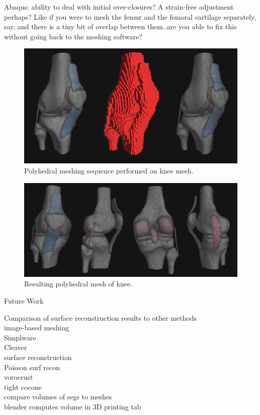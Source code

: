 Abaqus: ability to deal with initial over-closures? A strain-free adjustment perhaps? Like if you were to mesh the femur and the femoral cartilage separately, say, and there is a tiny bit of overlap between them..are you able to fix this without going back to the meshing software?  

\begin{figure}[tbh]
\centering
\includegraphics{media/sequence.png}
\caption[sequence]{Polyhedral meshing sequence performed on knee mesh.}
\label{fig.sequence}
\end{figure}

\begin{figure}[tbh]
\centering
\includegraphics[scale=0.82]{media/fullmesh.png}
\caption[polyhedral knee]{Resulting polyhedral mesh of knee.}
\label{fig.sample_1}
\end{figure}

Future Work

Comparison of surface reconstruction results to other methods \\
image-based meshing \\
Simplware \\
Cleaver \\
surface reconstruction \\
Poisson surf recon \\
vorocrust \\
tight cocone \\
compare volumes of segs to meshes \\
blender computes volume in 3D printing tab \\